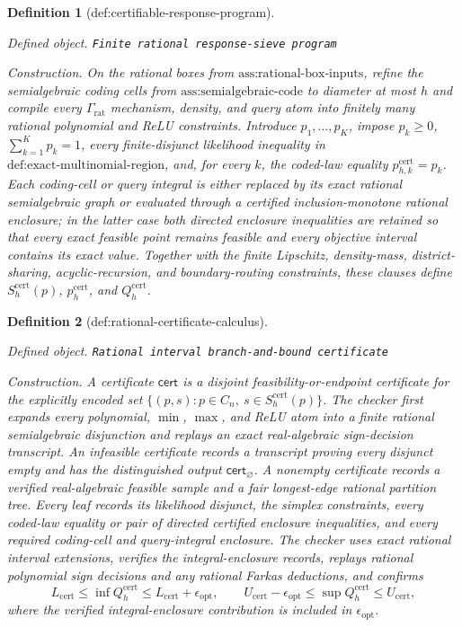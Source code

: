 \documentclass{article}
\newtheorem{definition}{Definition}
\begin{document}
\begin{definition}[def:certifiable-response-program]\label{def:certifiable-response-program}
\par\smallskip\noindent\emph{Defined object.} \texttt{Finite rational response-\allowbreak{}sieve program}
\par\smallskip\noindent\emph{Construction.} On the rational boxes from \(\text{ass:rational-box-inputs}\), refine the semialgebraic coding cells from \(\text{ass:semialgebraic-code}\) to diameter at most \(h\) and compile every \(\Gamma_{\mathrm{rat}}\) mechanism, density, and query atom into finitely many rational polynomial and ReLU constraints. Introduce \(p_1,\ldots,p_K\), impose \(p_k\ge0\), \(\sum_{k=1}^Kp_k=1\), every finite-disjunct likelihood inequality in \(\text{def:exact-multinomial-region}\), and, for every \(k\), the coded-law equality \(p_{h,k}^{\mathrm{cert}}=p_k\). Each coding-cell or query integral is either replaced by its exact rational semialgebraic graph or evaluated through a certified inclusion-monotone rational enclosure; in the latter case both directed enclosure inequalities are retained so that every exact feasible point remains feasible and every objective interval contains its exact value. Together with the finite Lipschitz, density-mass, district-sharing, acyclic-recursion, and boundary-routing constraints, these clauses define \(S_h^{\mathrm{cert}}(p)\), \(p_h^{\mathrm{cert}}\), and \(Q_h^{\mathrm{cert}}\).
\end{definition}

\begin{definition}[def:rational-certificate-calculus]\label{def:rational-certificate-calculus}
\par\smallskip\noindent\emph{Defined object.} \texttt{Rational interval branch-\allowbreak{}and-\allowbreak{}bound certificate}
\par\smallskip\noindent\emph{Construction.} A certificate \(\mathsf{cert}\) is a disjoint feasibility-or-endpoint certificate for the explicitly encoded set \(\{(p,s):p\in C_n,\ s\in S_h^{\mathrm{cert}}(p)\}\).  The checker first expands every polynomial, \(\min\), \(\max\), and ReLU atom into a finite rational semialgebraic disjunction and replays an exact real-algebraic sign-decision transcript.  An infeasible certificate records a transcript proving every disjunct empty and has the distinguished output \(\mathsf{cert}_{\varnothing}\).  A nonempty certificate records a verified real-algebraic feasible sample and a fair longest-edge rational partition tree.  Every leaf records its likelihood disjunct, the simplex constraints, every coded-law equality or pair of directed certified enclosure inequalities, and every required coding-cell and query-integral enclosure.  The checker uses exact rational interval extensions, verifies the integral-enclosure records, replays rational polynomial sign decisions and any rational Farkas deductions, and confirms
\[
L_{\mathrm{cert}}\leq\inf Q_h^{\mathrm{cert}}\leq L_{\mathrm{cert}}+\epsilon_{\mathrm{opt}},
\qquad
U_{\mathrm{cert}}-\epsilon_{\mathrm{opt}}\leq\sup Q_h^{\mathrm{cert}}\leq U_{\mathrm{cert}},
\]
where the verified integral-enclosure contribution is included in \(\epsilon_{\mathrm{opt}}\).
\end{definition}
\end{document}
